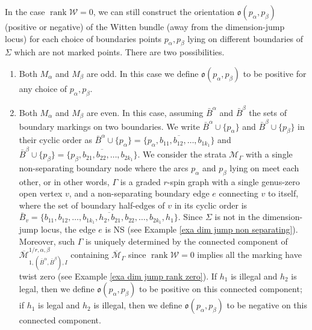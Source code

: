\documentclass[11pt,a4paper]{article}
\theoremstyle{definition}
\theoremstyle{remark}
\numberwithin{equation}{section}
\def\Mbar{{\overline{\mathcal M}}}
\begin{document}
  
In the case $\operatorname{rank} \mathcal W =0$, we can still construct the orientation $\mathfrak o (p_\alpha,p_\beta)$ (positive or negative) of the Witten bundle (away from the dimension-jump locus) for each choice of boundaries points $p_\alpha,p_\beta$ lying on different boundaries of $\Sigma$ which are not marked points. There are two possibilities.
\begin{enumerate}
    \item Both $M_\alpha$ and $M_\beta$ are odd. In this case we define $\mathfrak o (p_\alpha,p_\beta)$ to be positive for any choice of $p_\alpha,p_\beta$.
    \item Both $M_\alpha$ and $M_\beta$ are even. In this case, assuming $\bar{B}^\alpha$ and $\bar{B}^\beta$ the sets of boundary markings on two boundaries. We write $\bar{B}^\alpha\cup\{p_\alpha\}$ and $\bar{B}^\beta\cup\{p_\beta\}$  in their cyclic order as $\bar{B}^\alpha\cup\{p_\alpha\}=\overline{\{p_\alpha,b_{11},b_{12},\dots,b_{1k_1}\}}$ and $\bar{B}^\beta\cup\{p_\beta\}=\overline{\{p_\beta,b_{21},b_{22},\dots,b_{2k_1}\}}$. 
    We consider the strata $\mathcal M_{\Gamma}$ with a single non-separating boundary node where the arcs $p_\alpha$ and $p_\beta$ lying on meet each other, or in other words, $\Gamma$ is a graded $r$-spin graph with a single genus-zero open vertex $v$, and a non-separating boundary edge $e$ connecting $v$ to itself, where the set of boundary half-edges of $v$ in its cyclic order is $\bar{B}_v=\overline{\{b_{11},b_{12},\dots,b_{1k_1},h_2,b_{21},b_{22},\dots,b_{2k_1},h_1\}}$. Since $\Sigma$ is not in the dimension-jump locus, the edge $e$ is NS (see Example \ref{exa dim jump non separating}). Moreover, such $\Gamma$ is uniquely determined by the connected component of $\Mbar^{1/r,\alpha,\beta}_{{1,(\bar{B}^\alpha,\bar{B}^\beta),I}}$ containing $\Mbar_{\Gamma}$ since  $\operatorname{rank} \mathcal W =0$ implies all the marking have twist zero (see Example \ref{exa dim jump rank zero}). If $h_1$ is illegal and $h_2$ is legal, then we define $\mathfrak o (p_\alpha,p_\beta)$ to be positive on this connected component; if $h_1$ is legal and $h_2$ is illegal, then we define $\mathfrak o (p_\alpha,p_\beta)$ to be negative on this connected component.
    
\end{enumerate}
\end{document}
